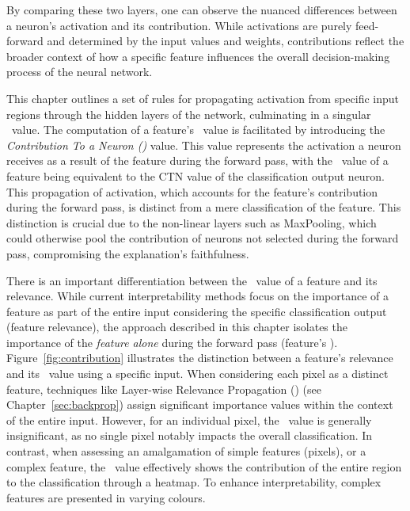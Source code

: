By comparing these two layers, one can observe the nuanced differences between a neuron's activation and its contribution. While activations are purely feed-forward and determined by the input values and weights, contributions reflect the broader context of how a specific feature influences the overall decision-making process of the neural network.

This chapter outlines a set of rules for propagating activation from specific input regions through the hidden layers of the network, culminating in a singular \CTC\ value. The computation of a feature's \CTC\ value is facilitated by introducing the \emph{Contribution To a Neuron (\CTN)} value. This value represents the activation a neuron receives as a result of the feature during the forward pass, with the \CTC\ value of a feature being equivalent to the CTN value of the classification output neuron. This propagation of activation, which accounts for the feature's contribution during the forward pass, is distinct from a mere classification of the feature. This distinction is crucial due to the non-linear layers such as MaxPooling, which could otherwise pool the contribution of neurons not selected during the forward pass, compromising the explanation's faithfulness.


There is an important differentiation between the \CTC\ value of a feature and its relevance. While current interpretability methods focus on the importance of a feature as part of the entire input considering the specific classification output (\ie feature relevance), the approach described in this chapter isolates the importance of the \textit{feature alone} during the forward pass (\ie feature's \CTC\/). Figure~\ref{fig:contribution} illustrates the distinction between a feature's relevance and its \CTC\ value using a specific input. When considering each pixel as a distinct feature, techniques like Layer-wise Relevance Propagation (\LRP\/) (see Chapter~\ref{sec:backprop}) assign significant importance values within the context of the entire input. However, for an individual pixel, the \CTC\ value is generally insignificant, as no single pixel notably impacts the overall classification. In contrast, when assessing an amalgamation of simple features (pixels), or a complex feature, the \CTC\ value effectively shows the contribution of the entire region to the classification through a heatmap. To enhance interpretability, complex features are presented in varying colours.




